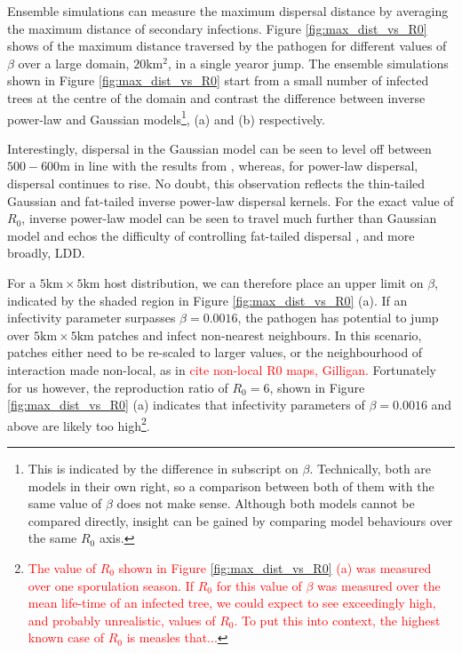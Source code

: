 Ensemble simulations can measure the maximum dispersal distance by averaging the maximum distance of secondary infections. Figure \ref{fig:max_dist_vs_R0} shows of the maximum distance traversed by the pathogen for different values of $\beta$ over a large domain, $20\mathrm{km^2}$, in a single year\textemdash or jump. The ensemble simulations shown in Figure \ref{fig:max_dist_vs_R0} start from a small number of infected trees at the centre of the domain and contrast the difference between inverse power-law and Gaussian models\footnote{This is indicated by the difference in subscript on $\beta$. Technically, both are models in their own right, so a comparison between both of them with the same value of $\beta$ does not make sense. Although both models cannot be compared directly, insight can be gained by comparing model behaviours over the same $R_0$ axis.}, (a) and (b) respectively. 

Interestingly, dispersal in the Gaussian model can be seen to level off between $500-600\mathrm{m}$ in line with the results from \cite{grosdidier2018tracking}, whereas, for power-law dispersal, dispersal continues to rise. No doubt, this observation reflects the thin-tailed Gaussian and fat-tailed inverse power-law dispersal kernels. For the exact value of $R_0$, inverse power-law model can be seen to travel much further than Gaussian model and echos the difficulty of controlling fat-tailed dispersal \cite{WEBIDEMICS}, and more broadly, LDD.

For a $5\mathrm{km} \times 5 \mathrm{km}$ host distribution, we can therefore place an upper limit on $\beta$, indicated by the shaded region in Figure \ref{fig:max_dist_vs_R0} (a). If an infectivity parameter surpasses $\beta = 0.0016$, the pathogen has potential to jump over $5\mathrm{km} \times 5 \mathrm{km}$ patches and infect non-nearest neighbours. In this scenario, patches either need to be re-scaled to larger values, or the neighbourhood of interaction made non-local, as in \textcolor{red}{cite non-local R0 maps, Gilligan.} Fortunately for us however, the reproduction ratio of $R_0=6$, shown in Figure \ref{fig:max_dist_vs_R0} (a) indicates that infectivity parameters of $\beta = 0.0016$ and above are likely too high\footnote{\textcolor{red}{The value of $R_0$ shown in Figure \ref{fig:max_dist_vs_R0} (a) was measured over one sporulation season. If $R_0$ for this value of $\beta$ was measured over the mean life-time of an infected tree, we could expect to see exceedingly high, and probably unrealistic, values of $R_0$. To put this into context, the highest known case of $R_0$ is measles that...}}.

